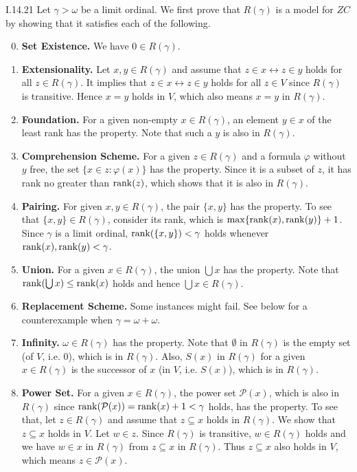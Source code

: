 \documentclass[12pt]{article}
\begin{document}
\begin{customthm}{I.14.21}
  Let $\gamma>\omega$ be a limit ordinal. We first prove that $R(\gamma)$ is a model for $ZC$ by showing that it satisfies each of the following.
  \begin{enumerate}
    \setcounter{enumi}{-1}
    \item\textbf{Set Existence.} We have $0\in R(\gamma)$.
    \item\textbf{Extensionality.} Let $x,y\in R(\gamma)$ and assume that $z\in x\leftrightarrow z\in y$ holds for all $z\in R(\gamma)$. It implies that $z\in x\leftrightarrow z\in y$ holds for all $z\in V$ since $R(\gamma)$ is transitive. Hence $x=y$ holds in $V$, which also means $x=y$ in $R(\gamma)$.
    \item\textbf{Foundation.} For a given non-empty $x\in R(\gamma)$, an element $y\in x$ of the least rank has the property. Note that such a $y$ is also in $R(\gamma)$.
    \item\textbf{Comprehension Scheme.} For a given $z\in R(\gamma)$ and a formula $\varphi$ without $y$ free, the set $\{x\in z:\varphi(x)\}$ has the property. Since it is a subset of $z$, it has rank no greater than $\mathop{\mathrm{rank}}(z)$, which shows that it is also in $R(\gamma)$.
    \item\textbf{Pairing.} For given $x,y\in R(\gamma)$, the pair $\{x,y\}$ has the property. To see that $\{x,y\}\in R(\gamma)$, consider its rank, which is $\max\{\mathop{\mathrm{rank}}(x),\mathop{\mathrm{rank}}(y)\}+1$. Since $\gamma$ is a limit ordinal, $\mathop{\mathrm{rank}}(\{x,y\})<\gamma$ holds whenever $\mathop{\mathrm{rank}}(x),\mathop{\mathrm{rank}}(y)<\gamma$.
    \item\textbf{Union.} For a given $x\in R(\gamma)$, the union $\bigcup x$ has the property. Note that $\mathop{\mathrm{rank}}(\bigcup x)\leq\mathop{\mathrm{rank}}(x)$ holds and hence $\bigcup x\in R(\gamma)$.
    \item\textbf{Replacement Scheme.} Some instances might fail. See below for a counterexample when $\gamma=\omega+\omega$.
    \item\textbf{Infinity.} $\omega\in R(\gamma)$ has the property. Note that $\emptyset$ in $R(\gamma)$ is the empty set (of $V$, i.e. $0$), which is in $R(\gamma)$. Also, $S(x)$ in $R(\gamma)$ for a given $x\in R(\gamma)$ is the successor of $x$ (in $V$, i.e. $S(x)$), which is in $R(\gamma)$.
    \item\textbf{Power Set.} For a given $x\in R(\gamma)$, the power set $\mathcal{P}(x)$, which is also in $R(\gamma)$ since $\mathop{\mathrm{rank}}(\mathcal{P}(x))=\mathop{\mathrm{rank}}(x)+1<\gamma$ holds, has the property. To see that, let $z\in R(\gamma)$ and assume that $z\subseteq x$ holds in $R(\gamma)$. We show that $z\subseteq x$ holds in $V$. Let $w\in z$. Since $R(\gamma)$ is transitive, $w\in R(\gamma)$ holds and we have $w\in x$ in $R(\gamma)$ from $z\subseteq x$ in $R(\gamma)$. Thus $z\subseteq x$ also holds in $V$, which means $z\in\mathcal{P}(x)$.

\end{enumerate}
\end{customthm}
\end{document}
